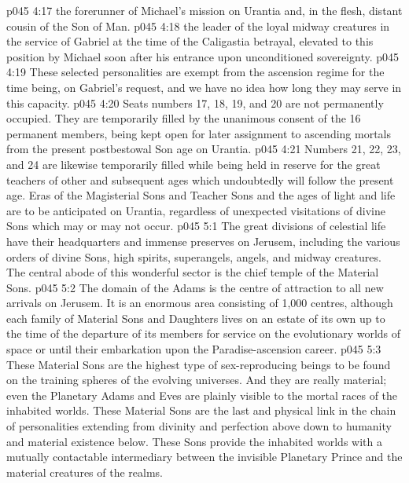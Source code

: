 \vs p045 4:17 \bibnobreakspace {} the forerunner of Michael’s mission on Urantia and, in the flesh, distant cousin of the Son of Man.
\vs p045 4:18 \bibnobreakspace {} the leader of the loyal midway creatures in the service of Gabriel at the time of the Caligastia betrayal, elevated to this position by Michael soon after his entrance upon unconditioned sovereignty.
\vs p045 4:19 \pc These selected personalities are exempt from the ascension regime for the time being, on Gabriel’s request, and we have no idea how long they may serve in this capacity.
\vs p045 4:20 Seats numbers 17, 18, 19, and 20 are not permanently occupied. They are temporarily filled by the unanimous consent of the 16 permanent members, being kept open for later assignment to ascending mortals from the present postbestowal Son age on Urantia.
\vs p045 4:21 Numbers 21, 22, 23, and 24 are likewise temporarily filled while being held in reserve for the great teachers of other and subsequent ages which undoubtedly will follow the present age. Eras of the Magisterial Sons and Teacher Sons and the ages of light and life are to be anticipated on Urantia, regardless of unexpected visitations of divine Sons which may or may not occur.
\vs p045 5:1 The great divisions of celestial life have their headquarters and immense preserves on Jerusem, including the various orders of divine Sons, high spirits, superangels, angels, and midway creatures. The central abode of this wonderful sector is the chief temple of the Material Sons.
\vs p045 5:2 The domain of the Adams is the centre of attraction to all new arrivals on Jerusem. It is an enormous area consisting of 1,000 centres, although each family of Material Sons and Daughters lives on an estate of its own up to the time of the departure of its members for service on the evolutionary worlds of space or until their embarkation upon the Paradise\hyp{}ascension career.
\vs p045 5:3 These Material Sons are the highest type of sex\hyp{}reproducing beings to be found on the training spheres of the evolving universes. And they are really material; even the Planetary Adams and Eves are plainly visible to the mortal races of the inhabited worlds. These Material Sons are the last and physical link in the chain of personalities extending from divinity and perfection above down to humanity and material existence below. These Sons provide the inhabited worlds with a mutually contactable intermediary between the invisible Planetary Prince and the material creatures of the realms.
